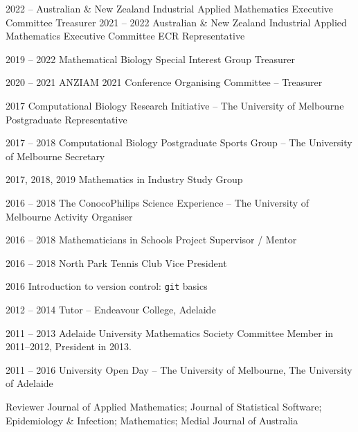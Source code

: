 \documentclass[9pt]{developercv} %
\begin{document}
\begin{entrylist}
    \entry
        {2022 -- }
        {Australian \& New Zealand Industrial Applied Mathematics Executive Committee}
        {}
        {Treasurer}
    \entry
        {2021 -- 2022}
        {Australian \& New Zealand Industrial Applied Mathematics Executive Committee}
        {}
        {ECR Representative}
        
    \entry
        {2019 -- 2022}
        {Mathematical Biology Special Interest Group}
        {}
        {Treasurer}
        
    \entry
        {2020 -- 2021}
        {ANZIAM 2021 Conference}
        {}
        {Organising Committee -- Treasurer}
        
    \entry
        {2017}
        {Computational Biology Research Initiative -- The University of Melbourne}
        {}
        {Postgraduate Representative}
        
    \entry
        {2017 -- 2018}
        {Computational Biology Postgraduate Sports Group -- The University of Melbourne}
        {}
        {Secretary}
    
    \entry
        {2017, 2018, 2019}
        {Mathematics in Industry Study Group}
        {}
        {}
        
    \entry
        {2016 -- 2018}
        {The ConocoPhilips Science Experience -- The University of Melbourne}
        {}
        {Activity Organiser}
        
    \entry
        {2016 -- 2018}
        {Mathematicians in Schools}
        {}
        {Project Supervisor / Mentor}
        
    \entry
        {2016 -- 2018}
        {North Park Tennis Club}
        {}
        {Vice President}
        
    \entry
        {2016}
        {Introduction to version control: \texttt{git} basics}
        {}
        {}
        
    \entry
        {2012 -- 2014}
        {Tutor -- Endeavour College, Adelaide}
        {}
        {}
    
    \entry
        {2011 -- 2013}
        {Adelaide University Mathematics Society}
        {}
        {Committee Member in 2011--2012, President in 2013.}
        
    \entry
        {2011 -- 2016}
        {University Open Day -- The University of Melbourne, The University of Adelaide}
        {}
        {}
        
    \entry
        {}
        {Reviewer}
        {}
        {Journal of Applied Mathematics; Journal of Statistical Software; Epidemiology \& Infection; Mathematics; Medial Journal of Australia}
\end{entrylist}
\end{document}
